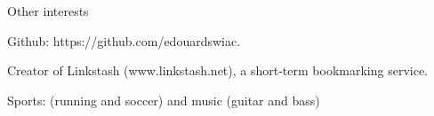 \documentclass{resume} %
\begin{document}

\begin{rSection}{Other interests}

\item Github: https://github.com/edouardswiac.
\item Creator of Linkstash (www.linkstash.net), a short-term bookmarking service.
\item Sports: (running and soccer) and music (guitar and bass)
\end{rSection}

\end{document}

